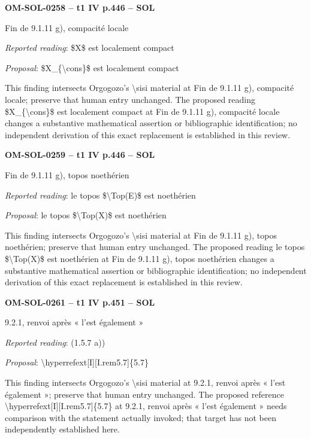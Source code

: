 \par\noindent\textbf{OM-SOL-0258 -- t1 IV p.446 -- SOL}\par
Fin de 9.1.11 g), compacité locale\par
\emph{Reported reading}: \$X\$ est localement compact\par
\emph{Proposal}: \$X\_\{\textbackslash{}cons\}\$ est localement compact\par
This finding intersects Orgogozo's \textbackslash{}sisi material at Fin de 9.1.11 g), compacité locale; preserve that human entry unchanged. The proposed reading \$X\_\{\textbackslash{}cons\}\$ est localement compact at Fin de 9.1.11 g), compacité locale changes a substantive mathematical assertion or bibliographic identification; no independent derivation of this exact replacement is established in this review.\par
\par\noindent\textbf{OM-SOL-0259 -- t1 IV p.446 -- SOL}\par
Fin de 9.1.11 g), topos noethérien\par
\emph{Reported reading}: le topos \$\textbackslash{}Top(E)\$ est noethérien\par
\emph{Proposal}: le topos \$\textbackslash{}Top(X)\$ est noethérien\par
This finding intersects Orgogozo's \textbackslash{}sisi material at Fin de 9.1.11 g), topos noethérien; preserve that human entry unchanged. The proposed reading le topos \$\textbackslash{}Top(X)\$ est noethérien at Fin de 9.1.11 g), topos noethérien changes a substantive mathematical assertion or bibliographic identification; no independent derivation of this exact replacement is established in this review.\par
\par\noindent\textbf{OM-SOL-0261 -- t1 IV p.451 -- SOL}\par
9.2.1, renvoi après « l'est également »\par
\emph{Reported reading}: (1.5.7 a))\par
\emph{Proposal}: \textbackslash{}hyperrefext[I][I.rem5.7]\{5.7\}\par
This finding intersects Orgogozo's \textbackslash{}sisi material at 9.2.1, renvoi après « l'est également »; preserve that human entry unchanged. The proposed reference \textbackslash{}hyperrefext[I][I.rem5.7]\{5.7\} at 9.2.1, renvoi après « l'est également » needs comparison with the statement actually invoked; that target has not been independently established here.\par
